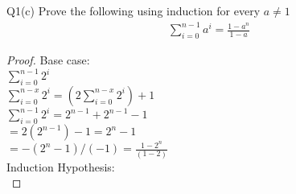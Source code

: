 \begin{problem}
  {Q1(c)}
  Prove the following using induction for every $a \ne 1$ \\
  \begin{align*}
    \sum_{i=0}^{n-1}a^i = \frac{1 - a^n}{1-a}
  \end{align*}
  \begin{proof}
    Base case: \\
    $\sum_{i=0}^{n-1}2^i$ \\
    $\sum_{i=0}^{n-x}2^i = (2\sum_{i = 0}^{n-x}2^i) + 1$\\
    $\sum_{i=0}^{n-1}2^i = 2^{n-1} + 2^{n-1} - 1$ \\
    $=2(2^{n-1}) - 1 = 2^{n} - 1$ \\
    $=-(2^{n} - 1) / (-1) = \frac{1 - 2^n}{(1 - 2)}$ \\
    Induction Hypothesis: \\
  \end{proof}
\end{problem}
